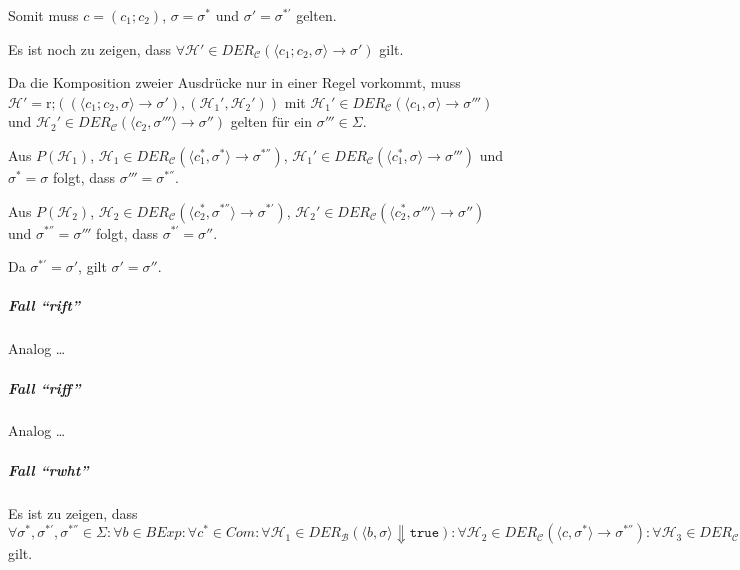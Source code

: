 \documentclass[a4paper, 11pt, accentcolor = tud3b]{tudreport}
\begin{document}
					    Somit muss $ c = (c _ 1 ; c _ 2) $, $ \sigma = \sigma ^ * $ und $ \sigma' = \sigma ^ {*'} $ gelten.
					    
					    Es ist noch zu zeigen, dass $ \forall \mathcal{H}' \in \textit{DER} _ \mathcal{C} (\langle c _ 1 ; c _ 2, \sigma \rangle \rightarrow \sigma') $ gilt.
					    
					    Da die Komposition zweier Ausdrücke nur in einer Regel vorkommt, muss $ \mathcal{H}' = \text{r;}((\langle c _ 1 ; c _ 2, \sigma \rangle \rightarrow \sigma'), (\mathcal{H} _ 1 ', \mathcal{H} _ 2 ')) $ mit $ \mathcal{H} _ 1 ' \in \textit{DER} _ \mathcal{C} (\langle c _ 1, \sigma \rangle \rightarrow \sigma''') $ und $ \mathcal{H} _ 2 ' \in \textit{DER} _ \mathcal{C} (\langle c _ 2, \sigma''' \rangle \rightarrow \sigma'') $ gelten für ein $ \sigma''' \in \Sigma $.
					    
					    Aus $ P(\mathcal{H} _ 1) $, $ \mathcal{H} _ 1 \in \textit{DER} _ \mathcal{C} (\langle c _ 1 ^ *, \sigma ^ * \rangle \rightarrow \sigma ^ {*''}) $, $ \mathcal{H} _ 1 ' \in \textit{DER} _ \mathcal{C} (\langle c _ 1 ^ *, \sigma \rangle \rightarrow \sigma''') $ und $ \sigma ^ * = \sigma $ folgt, dass $ \sigma''' = \sigma ^ {*''} $.
					    
					    Aus $ P(\mathcal{H} _ 2) $, $ \mathcal{H} _ 2 \in \textit{DER} _ \mathcal{C} (\langle c _ 2 ^ *, \sigma ^ {*''} \rangle \rightarrow \sigma ^ {*'}) $, $ \mathcal{H} _ 2 ' \in \textit{DER} _ \mathcal{C} (\langle c _ 2 ^ *, \sigma''' \rangle \rightarrow \sigma'' ) $ und  $ \sigma ^ {*''} = \sigma''' $ folgt, dass $ \sigma ^ {*'} = \sigma'' $.
					    
					    Da $ \sigma ^ {*'} = \sigma' $, gilt $ \sigma' = \sigma'' $.
				    
				    \subparagraph{Fall \enquote{rift}}
					    Analog \dots
				    
				    \subparagraph{Fall \enquote{riff}}
					    Analog \dots
				    
				    \subparagraph{Fall \enquote{rwht}}
					    Es ist zu zeigen, dass $ \forall \sigma ^ *, \sigma ^ {*'}, \sigma ^ {*''} \in \Sigma : \forall b \in \textit{BExp} : \forall c ^ * \in \textit{Com} : \forall \mathcal{H} _ 1 \in \textit{DER} _ \mathcal{B} (\langle b, \sigma \rangle \Downarrow \texttt{true}) : \forall \mathcal{H} _ 2 \in \textit{DER} _ \mathcal{C} (\langle c, \sigma ^ * \rangle \rightarrow \sigma ^ {*''}) : \forall \mathcal{H} _ 3 \in \textit{DER} _ \mathcal{C} (\langle \texttt{while } b \texttt{ do } c \texttt{ od}, \sigma ^ {*''} \rangle \rightarrow \sigma ^ {*'}) : P(\mathcal{H} _ 2) \land P(\mathcal{H} _ 3) \implies P(\text{rwht})((\langle \texttt{while } b \texttt{ do } c \texttt{ od}, \sigma ^ * \rangle \rightarrow \sigma ^ {*'}), (\mathcal{H} _ 1, \mathcal{H} _ 2, \mathcal{H} _ 3)) $ gilt.
					    
\end{document}
